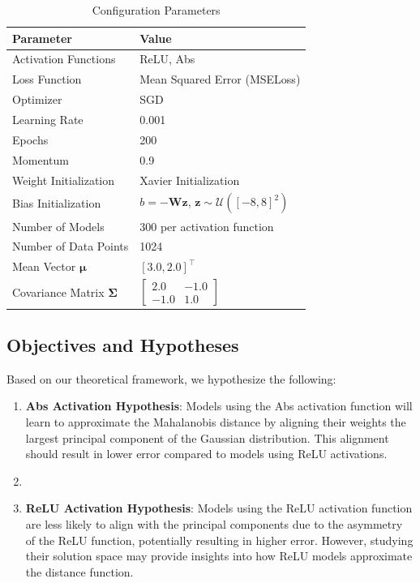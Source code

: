 \begin{table}[h]
\centering
\caption{Configuration Parameters}
\label{tab:config_params}
\begin{tabular}{ll}
\hline
Parameter & Value \\
\hline
Activation Functions & ReLU, Abs \\
Loss Function & Mean Squared Error (MSELoss) \\
Optimizer & SGD \\
Learning Rate & 0.001 \\
Epochs & 200 \\
Momentum & 0.9 \\
Weight Initialization & Xavier Initialization \\
Bias Initialization & $b = -\mathbf{W} \mathbf{z}$, $\mathbf{z} \sim \mathcal{U}([-8,8]^2)$ \\
Number of Models & 300 per activation function \\
Number of Data Points & 1024 \\
Mean Vector $\boldsymbol{\mu}$ & $[3.0, 2.0]^\top$ \\
Covariance Matrix $\boldsymbol{\Sigma}$ & $\begin{bmatrix} 2.0 & -1.0 \\ -1.0 & 1.0 \end{bmatrix}$ \\
\hline
\end{tabular}
\end{table}

\subsection{Objectives and Hypotheses}

Based on our theoretical framework, we hypothesize the following:

\begin{enumerate} 
    \item \textbf{Abs Activation Hypothesis}: Models using the Abs activation function will learn to approximate the Mahalanobis distance by aligning their weights the largest principal component of the Gaussian distribution. This alignment should result in lower error compared to models using ReLU activations.
    \item 
    \item \textbf{ReLU Activation Hypothesis}: Models using the ReLU activation function are less likely to align with the principal components due to the asymmetry of the ReLU function, potentially resulting in higher error. However, studying their solution space may provide insights into how ReLU models approximate the distance function.
\end{enumerate}

